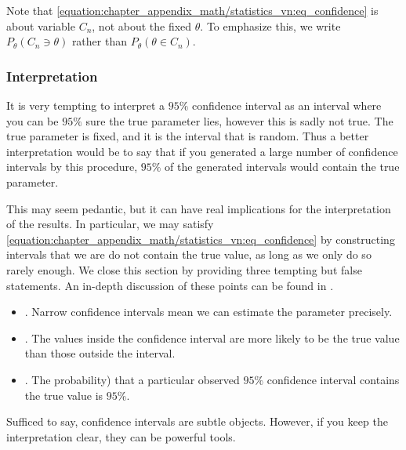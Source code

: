 \documentclass[letterpaper,11pt,english]{sphinxmanual}
\begin{document}
Note that \eqref{equation:chapter_appendix_math/statistics_vn:eq_confidence} is about variable \(C_n\), not
about the fixed \(\theta\). To emphasize this, we write
\(P_{\theta} (C_n \ni \theta)\) rather than
\(P_{\theta} (\theta \in C_n)\).


\subsubsection{Interpretation}
\label{\detokenize{chapter_appendix_math/statistics:interpretation}}
It is very tempting to interpret a \(95\%\) confidence interval as
an interval where you can be \(95\%\) sure the true parameter lies,
however this is sadly not true. The true parameter is fixed, and it is
the interval that is random. Thus a better interpretation would be to
say that if you generated a large number of confidence intervals by this
procedure, \(95\%\) of the generated intervals would contain the
true parameter.

This may seem pedantic, but it can have real implications for the
interpretation of the results. In particular, we may satisfy
\eqref{equation:chapter_appendix_math/statistics_vn:eq_confidence} by constructing intervals that we are  do not contain the true value, as long as we only do so rarely
enough. We close this section by providing three tempting but false
statements. An in-depth discussion of these points can be found in
.
\begin{itemize}
\item {} 
. Narrow confidence intervals mean we can estimate the
parameter precisely.

\item {} 
. The values inside the confidence interval are more
likely to be the true value than those outside the interval.

\item {} 
. The probability) that a particular observed
\(95\%\) confidence interval contains the true value is
\(95\%\).

\end{itemize}

Sufficed to say, confidence intervals are subtle objects. However, if
you keep the interpretation clear, they can be powerful tools.
\end{document}
